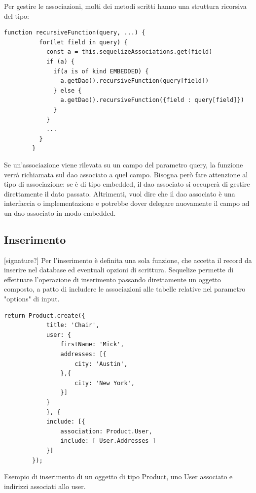 \documentclass[a4paper, 12pt]{scrartcl}
\begin{document}
      Per gestire le associazioni, molti dei metodi scritti hanno una struttura ricorsiva del tipo:
      \begin{Verbatim}[samepage=true]
        function recursiveFunction(query, ...) {
          for(let field in query) {
            const a = this.sequelizeAssociations.get(field)
            if (a) {
              if(a is of kind EMBEDDED) {
                a.getDao().recursiveFunction(query[field])
              } else {
                a.getDao().recursiveFunction({field : query[field]})
              }
            }
            ...
          }
        }
      \end{Verbatim}
      Se un'associazione viene rilevata su un campo del parametro query, la funzione verrà richiamata sul dao associato a quel campo. 
      Bisogna però fare attenzione al tipo di associazione: se è di tipo embedded, il dao associato si occuperà di gestire direttamente il dato passato. Altrimenti, vuol dire che il dao associato è una interfaccia o implementazione e potrebbe dover
      delegare nuovamente il campo ad un dao associato in modo embedded.

    \newpage
    \subsection*{Inserimento}
      [signature?]
      Per l'inserimento è definita una sola funzione, che accetta il record da inserire nel database ed eventuali opzioni di scrittura.
      Sequelize permette di effettuare l'operazione di inserimento passando direttamente un oggetto composto, a patto di includere le associazioni alle tabelle relative
      nel parametro "options" di input.
      \begin{Verbatim}[samepage=true]
        return Product.create({
            title: 'Chair',
            user: {
                firstName: 'Mick',
                addresses: [{
                    city: 'Austin',
                },{
                    city: 'New York',
                }]
            }
            }, {
            include: [{
                association: Product.User,
                include: [ User.Addresses ]
            }]
        });
      \end{Verbatim}
      Esempio di inserimento di un oggetto di tipo Product, uno User associato e indirizzi associati allo user.
\end{document}
